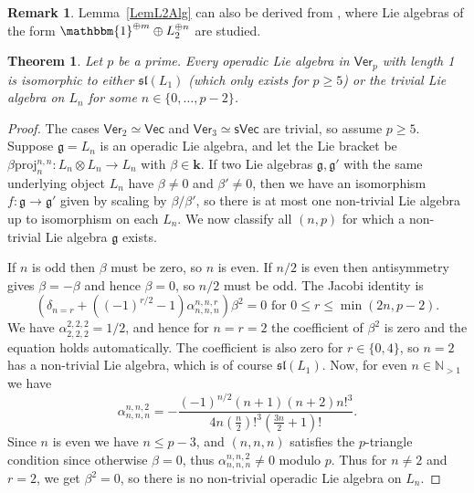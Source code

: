 \documentclass[11pt,a4paper,reqno]{amsart}
\newtheorem{theorem}[subsection]{Theorem}
\theoremstyle{definition}
\newtheorem{remark}[theorem]{Remark}
\newcommand{\bk}{\mathbf{k}}
\numberwithin{equation}{section}
\newcommand{\Ver}{\mathsf{Ver}}
\newcommand{\unit}{{\mathbbm{1}}}
\newcommand{\mN}{\mathbb{N}}
\newcommand{\fg}{\mathfrak{g}}
\newcommand{\fsl}{\mathfrak{sl}}
\newcommand{\Vecc}{\mathsf{Vec}}
\newcommand{\sVec}{\mathsf{sVec}}
\newcommand{\proj}{\mathrm{proj}}
\begin{document}
\begin{remark}
Lemma~\ref{LemL2Alg} can also be derived from \cite{EKO}, where Lie algebras of the form $\unit^{\oplus m}\oplus L_2^{\oplus n}$ are studied. 
\end{remark}

\begin{theorem}\label{ThmLength1}
Let $p$ be a prime. Every operadic Lie algebra in $\Ver_p$ with length 1 is isomorphic to either $\fsl(L_1)$ (which only exists for $p\geq5$) or the trivial Lie algebra on $L_n$ for some $n\in\{0,\dots,p-2\}$.
\end{theorem}

\begin{proof}
The cases $\Ver_2\simeq\Vecc$ and $\Ver_3\simeq\sVec$ are trivial, so assume $p\geq5$. Suppose $\fg=L_n$ is an operadic Lie algebra, and let the Lie bracket be $\beta\proj^{n,n}_n:L_n\otimes L_n\to L_n$ with $\beta\in\bk$. If two Lie algebras $\fg,\fg'$ with the same underlying object $L_n$ have $\beta\neq0$ and $\beta'\neq0$, then we have an isomorphism $f:\fg\to\fg'$ given by scaling by $\beta/\beta'$, so there is at most one non-trivial Lie algebra up to isomorphism on each $L_n$. We now classify all $(n,p)$ for which a non-trivial Lie algebra $\fg$ exists.

If $n$ is odd then $\beta$ must be zero, so $n$ is even. If $n/2$ is even then antisymmetry gives $\beta=-\beta$ and hence $\beta=0$, so $n/2$ must be odd. The Jacobi identity is
\[\left(\delta_{n=r}+\left((-1)^{r/2}-1\right)\alpha^{n,n,r}_{n,n,n}\right)\beta^2=0\text{ for }0\leq r\leq\min(2n,p-2).\]
We have $\alpha^{2,2,2}_{2,2,2}=1/2$, and hence for $n=r=2$ the coefficient of $\beta^2$ is zero and the equation holds automatically. The coefficient is also zero for $r\in\{0,4\}$, so $n=2$ has a non-trivial Lie algebra, which is of course $\fsl(L_1)$. Now, for even $n\in\mN_{>1}$ we have
\[\alpha^{n,n,2}_{n,n,n}=-\frac{(-1)^{n/2}(n+1)(n+2)n!^3}{4n(\frac n2)!^3(\frac{3n}2+1)!}.\]
Since $n$ is even we have $n\leq p-3$, and $(n,n,n)$ satisfies the $p$-triangle condition since otherwise $\beta=0$, thus $\alpha^{n,n,2}_{n,n,n}\neq0$ modulo $p$. Thus for $n\neq2$ and $r=2$, we get $\beta^2=0$, so there is no non-trivial operadic Lie algebra on $L_n$.
\end{proof}
\end{document}
